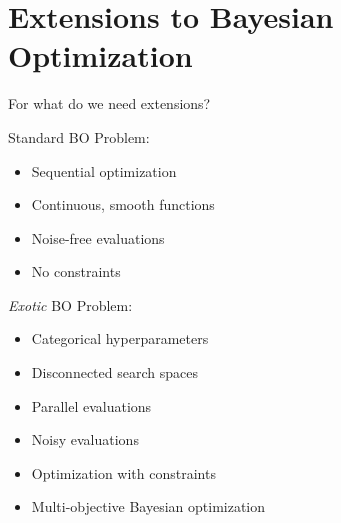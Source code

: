 \section{Extensions to Bayesian Optimization}

\begin{frame}{For what do we need extensions?}
\begin{block}{Standard BO Problem:}
\begin{itemize}
    \item Sequential optimization
    \pause
    \item Continuous, smooth functions
    \item Noise-free evaluations
    \item No constraints
\end{itemize}
\end{block}
\begin{block}{\emph{Exotic} BO Problem:}
\begin{itemize}
    \item Categorical hyperparameters
    \item Disconnected search spaces
    \item Parallel evaluations
    \item Noisy evaluations
    \item Optimization with constraints
    \item Multi-objective Bayesian optimization
\end{itemize}
\end{block}    
\end{frame}


